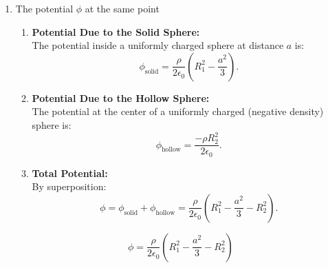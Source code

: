\documentclass[a4paper]{article}
\begin{document}
\begin{tcolorbox}
\begin{enumerate}[label=\alph*)]
\begin{enumerate}
    \item \textbf{Electric Field Due to the Hollow Sphere:} \\
    The field at the center of a uniformly charged spherical shell is zero:
    \[
    \vec{E}_{\text{hollow}} = \vec{0}.
    \]

    \item \textbf{Total Electric Field:} \\
    By superposition:
    \[
    \vec{E} = \vec{E}_{\text{solid}} + \vec{E}_{\text{hollow}} = \frac{\rho}{3\epsilon_0} \vec{a}.
    \]
\end{enumerate}
\[
\boxed{\vec{E} = \dfrac{\rho}{3\epsilon_0} \vec{a}}
\]
\item The potential $\phi$ at the same point
\begin{enumerate}
    \item \textbf{Potential Due to the Solid Sphere:} \\
    The potential inside a uniformly charged sphere at distance \( a \) is:
    \[
    \phi_{\text{solid}} = \frac{\rho}{2\epsilon_0} \left( R_1^2 - \frac{a^2}{3} \right).
    \]

    \item \textbf{Potential Due to the Hollow Sphere:} \\
    The potential at the center of a uniformly charged (negative density) sphere is:
    \[
    \phi_{\text{hollow}} = \frac{-\rho R_2^2}{2\epsilon_0}.
    \]

    \item \textbf{Total Potential:} \\
    By superposition:
    \[
    \phi = \phi_{\text{solid}} + \phi_{\text{hollow}} = \frac{\rho}{2\epsilon_0} \left( R_1^2 - \frac{a^2}{3} - R_2^2 \right).
    \]
\end{enumerate}

\[
\boxed{\phi = \dfrac{\rho}{2\epsilon_0} \left( R_1^2 - \dfrac{a^2}{3} - R_2^2 \right)}
\]
\end{enumerate}
\end{tcolorbox}
\end{document}
